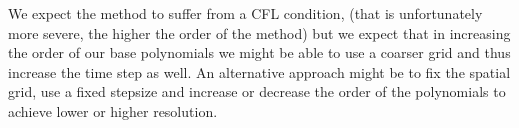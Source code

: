 \documentclass[a4paper,12pt]{scrartcl}
\renewcommand{\vec}[1]{{\mathbf{#1}}}
\begin{document}
We expect the method to suffer from a CFL condition, (that is unfortunately more severe, the 
higher the order of the method) but we expect that in increasing the order of 
our base polynomials we might be able to use a coarser grid and thus increase the 
time step as well. An alternative approach might be to fix the spatial grid,
use a fixed stepsize and increase or decrease the order of the polynomials to 
achieve lower or higher resolution. 

\end{document}
